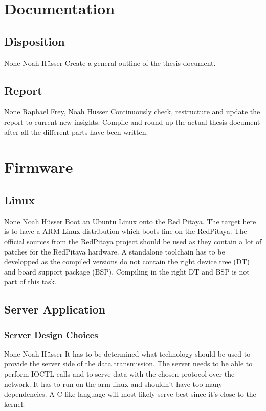 \documentclass[a4paper,oneside]{alpenspecs/alpenspecs}
\begin{document}
\section{Documentation}
\label{sec:docs}

\subsection{Disposition}
\wpac
    {}
    {}
    {}
    {None}
    {}
    {Noah H\"usser}
    {%
    Create a general outline of the thesis document.%
    }

\subsection{Report}
\wpac
    {}
    {}
    {}
    {None}
    {}
    {Raphael Frey, Noah H\"usser}
    {%
    Continuously check, restructure and update the report to current new insights.
    Compile and round up the actual thesis document after all the different parts have been written.%
    }


\section{Firmware}
\label{sec:firmware}

\subsection{Linux}
\label{subsec:fw:linux}

\wpac
    {}
    {}
    {}
    {None}
    {}
    {Noah H\"usser}
    {%
    Boot an Ubuntu Linux onto the Red Pitaya.%
    The target here is to have a ARM Linux distribution which boots fine on the RedPitaya.
    The official sources from the RedPitaya project should be used as they contain a lot of patches for the RedPitaya hardware.
    A standalone toolchain has to be developped as the compiled versions do not contain the right device tree (DT) and board support package (BSP).
    Compiling in the right DT and BSP is not part of this task.
    }

\subsection{Server Application}
\label{subsec:fw:server}

\subsubsection{Server Design Choices}
\label{subsubsec:fw:server:design-decisions}
\wpac
    {}
    {}
    {}
    {None}
    {}
    {Noah H\"usser}
    {%
        It has to be determined what technology should be used to provide the server side of the data transmission.
        The server needs to be able to perform IOCTL calls and to serve data with the chosen protocol over the network. It has to run on the arm linux and shouldn't have too many dependencies.
        A C-like language will most likely serve best since it's close to the kernel.
    }
\end{document}
